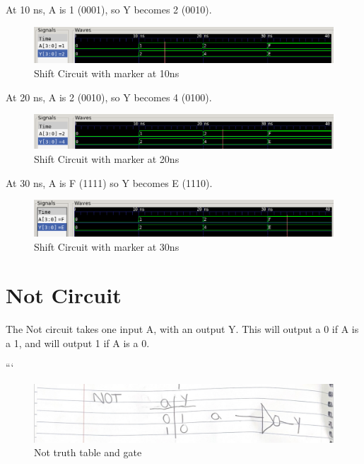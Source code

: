 \documentclass[12pt]{article}
\begin{document}
At 10 ns, A is 1 (0001), so Y becomes 2 (0010).
\begin{figure}[H]
    \centering
    \includegraphics[width = 1.0\textwidth]{1x4bit-shift/shift_wave2.PNG}
    \caption{Shift Circuit with marker at 10ns}
    \label{fig:shift-wave2}
\end{figure}

At 20 ns, A is 2 (0010), so Y becomes 4 (0100).
\begin{figure}[H]
    \centering
    \includegraphics[width = 1.0\textwidth]{1x4bit-shift/shift_wave3.PNG}
    \caption{Shift Circuit with marker at 20ns}
    \label{fig:shift-wave3}
\end{figure}


At 30 ns, A is F (1111) so Y becomes E (1110).
\begin{figure}[H]
    \centering
    \includegraphics[width = 1.0\textwidth]{1x4bit-shift/shift_wave4.PNG}
    \caption{Shift Circuit with marker at 30ns}
    \label{fig:shift-wave4}
\end{figure}

\section{Not Circuit}
The Not circuit takes one input A, with an output Y. This will output a 0 if A is a 1, and will output 1 if A is a 0.

```\begin{figure}[H]
    \centering
    \includegraphics[width = 1.0\textwidth]{Truth-Tables/NotTT.PNG}
    \caption{Not truth table and gate}
    \label{fig:shift-table}
\end{figure}
\end{document}
